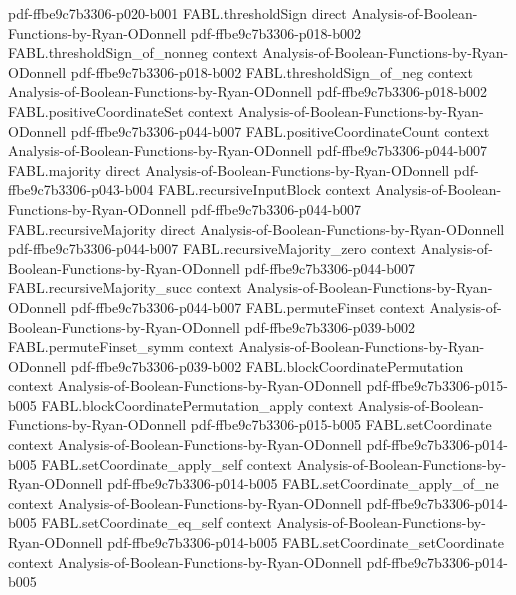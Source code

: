 \begin{theorem}
  {pdf-ffbe9c7b3306-p020-b001}
\proofstep
  {FABL.thresholdSign}
  {direct}
  {Analysis-of-Boolean-Functions-by-Ryan-ODonnell}
  {pdf-ffbe9c7b3306-p018-b002}
\proofstep
  {FABL.thresholdSign_of_nonneg}
  {context}
  {Analysis-of-Boolean-Functions-by-Ryan-ODonnell}
  {pdf-ffbe9c7b3306-p018-b002}
\proofstep
  {FABL.thresholdSign_of_neg}
  {context}
  {Analysis-of-Boolean-Functions-by-Ryan-ODonnell}
  {pdf-ffbe9c7b3306-p018-b002}
\proofstep
  {FABL.positiveCoordinateSet}
  {context}
  {Analysis-of-Boolean-Functions-by-Ryan-ODonnell}
  {pdf-ffbe9c7b3306-p044-b007}
\proofstep
  {FABL.positiveCoordinateCount}
  {context}
  {Analysis-of-Boolean-Functions-by-Ryan-ODonnell}
  {pdf-ffbe9c7b3306-p044-b007}
\proofstep
  {FABL.majority}
  {direct}
  {Analysis-of-Boolean-Functions-by-Ryan-ODonnell}
  {pdf-ffbe9c7b3306-p043-b004}
\proofstep
  {FABL.recursiveInputBlock}
  {context}
  {Analysis-of-Boolean-Functions-by-Ryan-ODonnell}
  {pdf-ffbe9c7b3306-p044-b007}
\proofstep
  {FABL.recursiveMajority}
  {direct}
  {Analysis-of-Boolean-Functions-by-Ryan-ODonnell}
  {pdf-ffbe9c7b3306-p044-b007}
\proofstep
  {FABL.recursiveMajority_zero}
  {context}
  {Analysis-of-Boolean-Functions-by-Ryan-ODonnell}
  {pdf-ffbe9c7b3306-p044-b007}
\proofstep
  {FABL.recursiveMajority_succ}
  {context}
  {Analysis-of-Boolean-Functions-by-Ryan-ODonnell}
  {pdf-ffbe9c7b3306-p044-b007}
\proofstep
  {FABL.permuteFinset}
  {context}
  {Analysis-of-Boolean-Functions-by-Ryan-ODonnell}
  {pdf-ffbe9c7b3306-p039-b002}
\proofstep
  {FABL.permuteFinset_symm}
  {context}
  {Analysis-of-Boolean-Functions-by-Ryan-ODonnell}
  {pdf-ffbe9c7b3306-p039-b002}
\proofstep
  {FABL.blockCoordinatePermutation}
  {context}
  {Analysis-of-Boolean-Functions-by-Ryan-ODonnell}
  {pdf-ffbe9c7b3306-p015-b005}
\proofstep
  {FABL.blockCoordinatePermutation_apply}
  {context}
  {Analysis-of-Boolean-Functions-by-Ryan-ODonnell}
  {pdf-ffbe9c7b3306-p015-b005}
\proofstep
  {FABL.setCoordinate}
  {context}
  {Analysis-of-Boolean-Functions-by-Ryan-ODonnell}
  {pdf-ffbe9c7b3306-p014-b005}
\proofstep
  {FABL.setCoordinate_apply_self}
  {context}
  {Analysis-of-Boolean-Functions-by-Ryan-ODonnell}
  {pdf-ffbe9c7b3306-p014-b005}
\proofstep
  {FABL.setCoordinate_apply_of_ne}
  {context}
  {Analysis-of-Boolean-Functions-by-Ryan-ODonnell}
  {pdf-ffbe9c7b3306-p014-b005}
\proofstep
  {FABL.setCoordinate_eq_self}
  {context}
  {Analysis-of-Boolean-Functions-by-Ryan-ODonnell}
  {pdf-ffbe9c7b3306-p014-b005}
\proofstep
  {FABL.setCoordinate_setCoordinate}
  {context}
  {Analysis-of-Boolean-Functions-by-Ryan-ODonnell}
  {pdf-ffbe9c7b3306-p014-b005}

\end{theorem}
